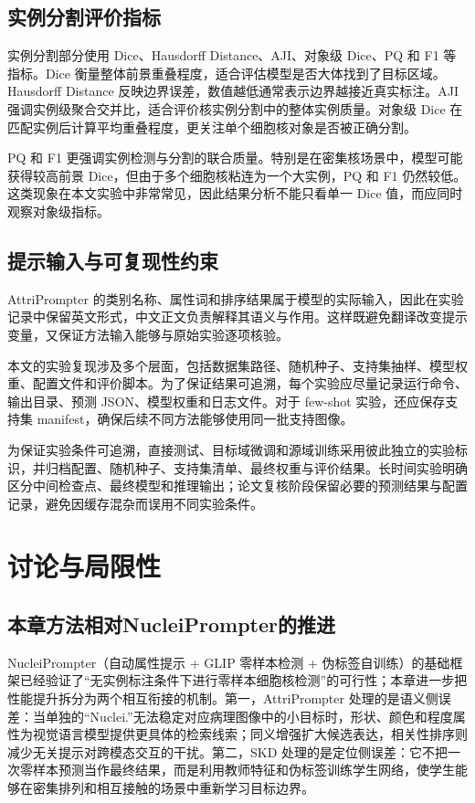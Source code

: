 \subsection{实例分割评价指标}
实例分割部分使用 Dice、Hausdorff Distance、AJI、对象级 Dice、PQ 和 F1 等指标。Dice 衡量整体前景重叠程度，适合评估模型是否大体找到了目标区域。Hausdorff Distance 反映边界误差，数值越低通常表示边界越接近真实标注。AJI 强调实例级聚合交并比，适合评价核实例分割中的整体实例质量。对象级 Dice 在匹配实例后计算平均重叠程度，更关注单个细胞核对象是否被正确分割。

PQ 和 F1 更强调实例检测与分割的联合质量。特别是在密集核场景中，模型可能获得较高前景 Dice，但由于多个细胞核粘连为一个大实例，PQ 和 F1 仍然较低。这类现象在本文实验中非常常见，因此结果分析不能只看单一 Dice 值，而应同时观察对象级指标。

\subsection{提示输入与可复现性约束}
AttriPrompter 的类别名称、属性词和排序结果属于模型的实际输入，因此在实验记录中保留英文形式，中文正文负责解释其语义与作用。这样既避免翻译改变提示变量，又保证方法输入能够与原始实验逐项核验。

本文的实验复现涉及多个层面，包括数据集路径、随机种子、支持集抽样、模型权重、配置文件和评价脚本。为了保证结果可追溯，每个实验应尽量记录运行命令、输出目录、预测 JSON、模型权重和日志文件。对于 few-shot 实验，还应保存支持集 manifest，确保后续不同方法能够使用同一批支持图像。

为保证实验条件可追溯，直接测试、目标域微调和源域训练采用彼此独立的实验标识，并归档配置、随机种子、支持集清单、最终权重与评价结果。长时间实验明确区分中间检查点、最终模型和推理输出；论文复核阶段保留必要的预测结果与配置记录，避免因缓存混杂而误用不同实验条件。

\section{讨论与局限性}

\subsection{本章方法相对NucleiPrompter的推进}

NucleiPrompter（自动属性提示 + GLIP 零样本检测 + 伪标签自训练）的基础框架已经验证了“无实例标注条件下进行零样本细胞核检测”的可行性；本章进一步把性能提升拆分为两个相互衔接的机制。第一，AttriPrompter 处理的是语义侧误差：当单独的“Nuclei.”无法稳定对应病理图像中的小目标时，形状、颜色和程度属性为视觉语言模型提供更具体的检索线索；同义增强扩大候选表达，相关性排序则减少无关提示对跨模态交互的干扰。第二，SKD 处理的是定位侧误差：它不把一次零样本预测当作最终结果，而是利用教师特征和伪标签训练学生网络，使学生能够在密集排列和相互接触的场景中重新学习目标边界。

